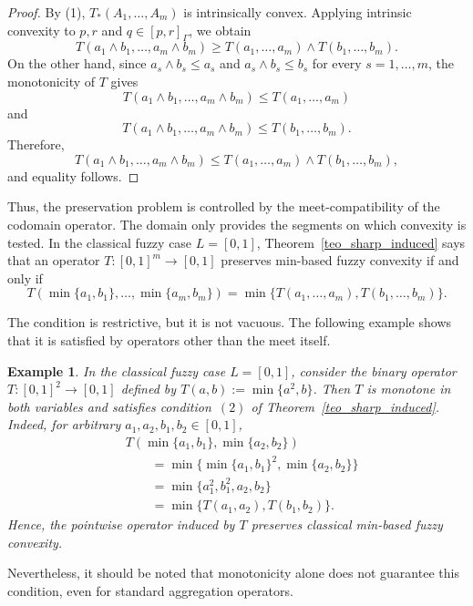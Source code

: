 \documentclass[11pt,a4paper]{article}
\newtheorem{example}{Example}
\begin{document}
\begin{proof}
By (1), \(T_*(A_1,\dots,A_m)\) is intrinsically convex. Applying intrinsic convexity to \(p,r\) and \(q\in[p,r]_{\Gamma}\), we obtain
\[
T(a_1\wedge b_1,\dots,a_m\wedge b_m)
\geq
T(a_1,\dots,a_m)\wedge T(b_1,\dots,b_m).
\]
On the other hand, since \(a_s\wedge b_s\le a_s\) and \(a_s\wedge b_s\le b_s\) for every \(s=1,\dots,m\), the monotonicity of \(T\) gives
\[
T(a_1\wedge b_1,\dots,a_m\wedge b_m)
\leq
T(a_1,\dots,a_m)
\]
and
\[
T(a_1\wedge b_1,\dots,a_m\wedge b_m)
\leq
T(b_1,\dots,b_m).
\]
Therefore,
\[
T(a_1\wedge b_1,\dots,a_m\wedge b_m)
\leq
T(a_1,\dots,a_m)\wedge T(b_1,\dots,b_m),
\]
and equality follows.
\end{proof}

Thus, the preservation problem is controlled by the meet-compatibility of the codomain operator. The domain only provides the segments on which convexity is tested. In the classical fuzzy case \(L=[0,1]\), Theorem~\ref{teo_sharp_induced} says that an operator \(T:[0,1]^m\to[0,1]\) preserves min-based fuzzy convexity if and only if
\[
T(\min\{a_1,b_1\},\dots,\min\{a_m,b_m\})
=
\min\{T(a_1,\dots,a_m),T(b_1,\dots,b_m)\}.
\]





The condition is restrictive, but it is not vacuous. The following example shows that it is satisfied by operators other than the meet itself.

\begin{example}\label{ex:positive_operator}
In the classical fuzzy case \(L=[0,1]\), consider the binary operator \(T:[0,1]^2\to[0,1]\) defined by \(T(a,b):=\min\{a^2,b\}\). Then \(T\) is monotone in both variables and satisfies condition~\((2)\) of Theorem~\ref{teo_sharp_induced}. Indeed, for arbitrary \(a_1,a_2,b_1,b_2\in[0,1]\),
\[
\begin{aligned}
&T(\min\{a_1,b_1\},\min\{a_2,b_2\})\\
&\qquad =
\min\{\min\{a_1,b_1\}^2,\min\{a_2,b_2\}\}\\
&\qquad =
\min\{a_1^2,b_1^2,a_2,b_2\}\\
&\qquad =
\min\{T(a_1,a_2),T(b_1,b_2)\}.
\end{aligned}
\]
Hence, the pointwise operator induced by \(T\) preserves classical min-based fuzzy convexity.
\end{example}

Nevertheless, it should be noted that monotonicity alone does not guarantee this condition, even for standard aggregation operators.
\end{document}
